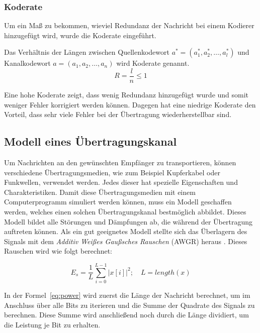 \subsubsection{Koderate}
\label{sec:codeRate}
Um ein Maß zu bekommen, wieviel Redundanz der Nachricht bei einem Kodierer hinzugefügt wird, wurde die Koderate eingeführt.

\begin{t_def}
Das Verhältnis der Längen zwischen Quellenkodewort $a^*=(a^*_1,a^*_2,\dotsc,a^*_l)$ und Kanalkodewort $a=(a_1,a_2,\dotsc,a_n)$ wird Koderate genannt.
\begin{equation}
R = \frac{l}{n} \leq 1
\end{equation} 
\end{t_def} 

Eine hohe Koderate zeigt, dass wenig Redundanz hinzugefügt wurde und somit weniger Fehler korrigiert werden können. Dagegen hat eine niedrige Koderate den Vorteil, dass sehr viele Fehler bei der Übertragung wiederherstellbar sind.~\cite[136]{schoenfeld2012informations} 

\subsection{Modell eines Übertragungskanal}
\label{sec:channels}
Um Nachrichten an den gewünschten Empfänger zu transportieren, können verschiedene Übertragungsmedien, wie zum Beispiel Kupferkabel oder Funkwellen, verwendet werden. Jedes dieser hat spezielle Eigenschaften und Charakteristiken. Damit diese Übertragungsmedien mit einem Computerprogramm simuliert werden können, muss ein Modell geschaffen werden, welches einen solchen Übertragungskanal bestmöglich abbildet. Dieses Modell bildet alle Störungen und Dämpfungen ab, die während der Übertragung auftreten können. Als ein gut geeignetes Modell stellte sich das Überlagern des Signals mit dem \emph{Additiv Weißes Gaußsches Rauschen} (AWGR) heraus \cite[81]{schoenfeld2012informations}. Dieses Rauschen wird wie folgt berechnet:

\begin{equation}
E_s = \frac{1}{L} \displaystyle\sum_{i=0}^{L-1} |x[i]|^2; \quad L = length(x)
\label{eq:power}
\end{equation}

In der Formel~\ref{eq:power} wird zuerst die Länge der Nachricht berechnet, um im Anschluss über alle Bits zu iterieren und die Summe der Quadrate des Signals zu berechnen. Diese Summe wird anschließend noch durch die Länge dividiert, um die Leistung je Bit zu erhalten.

